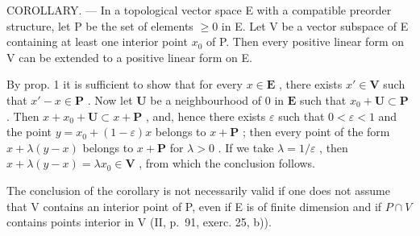 COROLLARY. --- In a topological vector space E with a compatible preorder structure, let P be the set of elements \(\geqslant 0\) in E. Let V be a vector subspace of E containing at least one interior point \(x_{0}\) of P. Then every positive linear form on V can be extended to a positive linear form on E.

By prop. 1 it is sufficient to show that for every \(x \in \mathbf{E}\) , there exists \(x' \in \mathbf{V}\) such that \(x' - x \in \mathbf{P}\) . Now let \(\mathbf{U}\) be a neighbourhood of 0 in \(\mathbf{E}\) such that \(x_0 + \mathbf{U} \subset \mathbf{P}\) . Then \(x + x_0 + \mathbf{U} \subset x + \mathbf{P}\) , and, hence there exists \(\varepsilon\) such that \(0 < \varepsilon < 1\) and the point \(y = x_0 + (1 - \varepsilon)x\) belongs to \(x + \mathbf{P}\) ; then every point of the form \(x + \lambda(y - x)\) belongs to \(x + \mathbf{P}\) for \(\lambda > 0\) . If we take \(\lambda = 1 / \varepsilon\) , then \(x + \lambda(y - x) = \lambda x_0 \in \mathbf{V}\) , from which the conclusion follows.

The conclusion of the corollary is not necessarily valid if one does not assume that V contains an interior point of P, even if E is of finite dimension and if \(P \cap V\) contains points interior in V (II, p.~91, exerc. 25, b)).
